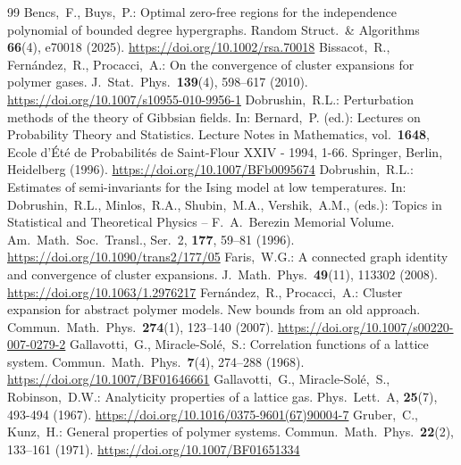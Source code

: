 \documentclass[10pt,a4paper]{amsart}
\begin{document}
\begin{thebibliography}{99}
 Bencs,~F., Buys,~P.: Optimal zero-free regions for the independence polynomial of bounded degree hypergraphs. Random Struct.\ \& Algorithms \textbf{66}(4), e70018 (2025). \url{https://doi.org/10.1002/rsa.70018}
 Bissacot,~R., Fern{\'a}ndez,~R., Procacci,~A.: On the convergence of cluster expansions for polymer gases. J.\ Stat.\ Phys.\ \textbf{139}(4), 598–617 (2010). \url{https://doi.org/10.1007/s10955-010-9956-1}
 Dobrushin,~R.L.: Perturbation methods of the theory of Gibbsian fields. In: Bernard,~P. (ed.): Lectures on Probability Theory and Statistics. Lecture Notes in Mathematics, vol.\ \textbf{1648}, Ecole d'{\'E}t{\'e} de Probabilit{\'e}s de Saint-Flour XXIV - 1994, 1-66. Springer, Berlin, Heidelberg (1996). \url{https://doi.org/10.1007/BFb0095674}
 Dobrushin,~R.L.: Estimates of semi-invariants for the Ising model at low temperatures. In: Dobrushin,~R.L., Minlos,~R.A., Shubin,~M.A., Vershik,~A.M., (eds.): Topics in Statistical and Theoretical Physics -- F.\ A.\ Berezin Memorial Volume. Am.\ Math.\ Soc.\ Transl., Ser.\ 2, \textbf{177}, 59–81 (1996). \url{https://doi.org/10.1090/trans2/177/05}
 Faris,~W.G.: A connected graph identity and convergence of cluster expansions. J.\ Math.\ Phys.\ \textbf{49}(11), 113302 (2008). \url{https://doi.org/10.1063/1.2976217}
 Fern{\'a}ndez,~R., Procacci,~A.: Cluster expansion for abstract polymer models. New bounds from an old approach. Commun.\ Math.\ Phys.\ \textbf{274}(1), 123–140 (2007). \url{https://doi.org/10.1007/s00220-007-0279-2}
 Gallavotti,~G., Miracle-Sol{\'e},~S.: Correlation functions of a lattice system. Commun.\ Math.\ Phys.\ \textbf{7}(4), 274–288 (1968). \url{https://doi.org/10.1007/BF01646661}
 Gallavotti,~G., Miracle-Sol{\'e},~S., Robinson,~D.W.: Analyticity properties of a lattice gas. Phys.\ Lett.\ A, \textbf{25}(7), 493-494 (1967). \url{https://doi.org/10.1016/0375-9601(67)90004-7}
 Gruber,~C., Kunz,~H.: General properties of polymer systems. Commun.\ Math.\ Phys.\ \textbf{22}(2), 133–161 (1971). \url{https://doi.org/10.1007/BF01651334}

\end{thebibliography}
\end{document}
